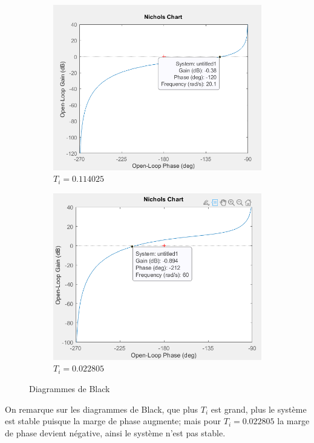 \documentclass[12pt, a4paper]{report}
\begin{document}
\begin{figure}[H]
\begin{subfigure}[h!]{0.4\linewidth}
        \includegraphics[width=\linewidth]{sim2ti3diag.png}
        \caption{$T_i = 0.114025$}
    \end{subfigure}
    \hfill    
    \begin{subfigure}[h!]{0.4\linewidth}
        \includegraphics[width=\linewidth]{sim2ti4diag.png}
        \caption{$T_i = 0.022805$}
    \end{subfigure}
    \caption{Diagrammes de Black}
    \label{fig:sim2Tiblacks}
\end{figure}

On remarque sur les diagrammes de Black, que plus $T_i$ est grand, plus le système est stable puisque la marge de phase augmente;
mais pour $T_i = 0.022805$ la marge de phase devient négative, ainsi le système n'est pas stable.
\end{document}
